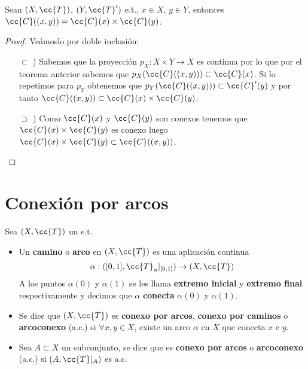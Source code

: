 \begin{prop}
    Sean $(X, \cc{T})$, $(Y, \cc{T}')$ e.t., $x\in X$, $y\in Y$, entonces $\cc{C}((x,y))=\cc{C}(x)\times \cc{C}(y)$.
    \begin{proof}
        Veámoslo por doble inclusión:
        \begin{itemize}
            \item[$\subset$ )] Sabemos que la proyección $p_X:X\times Y \to X$ es continua por lo que por el teorema anterior sabemos que $p_X(\cc{C}((x,y)))\subset \cc{C}(x)$. Si lo repetimos para $p_Y$ obtenemos que $p_Y(\cc{C}((x,y)))\subset \cc{C}'(y)$ y por tanto $\cc{C}((x,y))\subset\cc{C}(x)\times \cc{C}(y)$.
            \item[$\supset$ )] Como $\cc{C}(x)$ y $\cc{C}(y)$ son conexos tenemos que $\cc{C}(x)\times \cc{C}(y)$ es conexo luego $\cc{C}(x)\times \cc{C}(y)\subset \cc{C}((x,y))$.
        \end{itemize}
    \end{proof}
\end{prop}

\section{Conexión por arcos}

\begin{definicion}
    Sea $(X, \cc{T})$ un e.t. 
    \begin{itemize}
        \item Un \textbf{camino} o \textbf{arco} en $(X, \cc{T})$ es una aplicación continua 
        \begin{align*}
            \alpha: ([0,1], \cc{T}_u|_{[0,1]})\to (X, \cc{T})
        \end{align*}
        A los puntos $\alpha(0)$ y $\alpha(1)$ se les llama \textbf{extremo inicial} y \textbf{extremo final} respectivamente y decimos que $\alpha$ \textbf{conecta} $\alpha(0)$ y $\alpha(1)$. 

        \item Se dice que $(X, \cc{T})$ es \textbf{conexo por arcos}, \textbf{conexo por caminos} o \textbf{arcoconexo} (a.c.) si $\forall x,y\in X$, existe un arco $\alpha$ en $X$ que conecta $x$ e $y$.

        \item Sea $A\subset X$ un subconjunto, se dice que es \textbf{conexo por arcos} o \textbf{arcoconexo} (a.c.) si $(A, \cc{T}|_A)$ es a.c.
     \end{itemize}
\end{definicion}

